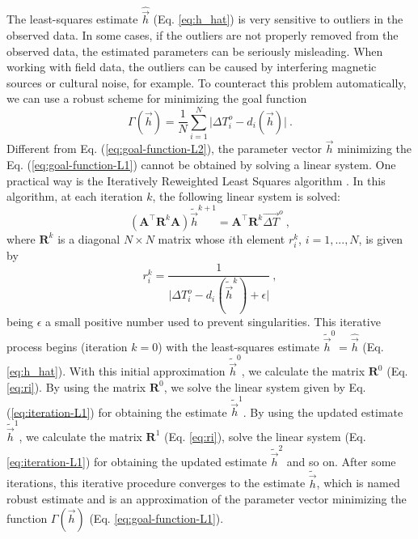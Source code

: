 \documentclass[journal abbreviation, npg]{copernicus}
\begin{document}
The least-squares estimate $\hat{\vec{h}}$ (Eq. \ref{eq:h_hat}) is very sensitive to outliers in the observed data. In some cases, if the outliers are not properly removed from the observed data, the estimated parameters can be seriously misleading. When working with field data, the outliers can be caused by interfering magnetic sources or cultural noise, for example. To counteract this problem automatically, we can use a robust scheme for minimizing the goal function
\begin{equation}
\Gamma(\vec{h}) = \frac{1}{N} \sum_{i = 1}^{N} 
\vert \Delta T^{o}_{i} - d_{i}(\vec{h}) \vert \: .
\label{eq:goal-function-L1}
\end{equation}
Different from Eq. (\ref{eq:goal-function-L2}), the parameter vector $\vec{h}$ minimizing the Eq. (\ref{eq:goal-function-L1}) cannot be obtained by solving a linear system. One practical way is the Iteratively Reweighted Least Squares algorithm \citep{scales_1988, aster-etal2005}. In this algorithm, at each iteration $k$, the following linear system is solved:
\begin{equation}
\left( \mathbf{A}^{\intercal} \mathbf{R}^{k} \mathbf{A} \right) \tilde{\vec{h}}^{k+1} =
\mathbf{A}^{\intercal} \mathbf{R}^{k} \vec{\Delta T}^{o} \: ,
\label{eq:iteration-L1}
\end{equation}
where $\mathbf{R}^{k}$ is a diagonal $N \times N$ matrix whose $i$th element $r_{i}^{k}$, $i = 1, ..., N$, is given by
\begin{equation}
r_{i}^{k} = \dfrac{1}{\vert \Delta T^{o}_{i} - d_{i}(\tilde{\vec{h}}^{k}) + \epsilon \vert} \: ,
\label{eq:ri}
\end{equation}
being $\epsilon$ a small positive number used to prevent singularities. This iterative process begins (iteration $k = 0$) with the least-squares estimate $\tilde{\vec{h}}^{0} = \hat{\vec{h}}$ (Eq. \ref{eq:h_hat}). With this initial approximation $\tilde{\vec{h}}^{0}$, we calculate the matrix $\mathbf{R}^{0}$ (Eq. \ref{eq:ri}). By using the matrix $\mathbf{R}^{0}$, we solve the linear system given by Eq. (\ref{eq:iteration-L1}) for obtaining the estimate $\tilde{\vec{h}}^{1}$. By using the updated estimate $\tilde{\vec{h}}^{1}$, we calculate the matrix $\mathbf{R}^{1}$ (Eq. \ref{eq:ri}), solve the linear system (Eq. \ref{eq:iteration-L1}) for obtaining the updated estimate $\tilde{\vec{h}}^{2}$ and so on. After some iterations, this iterative procedure converges to the estimate $\tilde{\vec{h}}$, which is named robust estimate and is an approximation of the parameter vector minimizing the function $\Gamma(\vec{h})$ (Eq. \ref{eq:goal-function-L1}).
\end{document}
